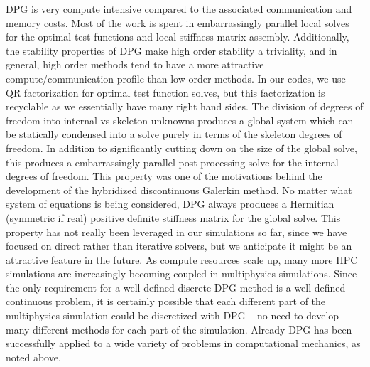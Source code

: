 \documentclass[preprint,12pt]{elsarticle}
\begin{document}
DPG is very compute intensive compared to the associated communication and memory costs.
Most of the work is spent in embarrassingly parallel local solves for the optimal test functions and local stiffness matrix assembly.
Additionally, the stability properties of DPG make high order stability a triviality, and in general, 
high order methods tend to have a more attractive compute/communication profile than low order methods.
In our codes, we use QR factorization for optimal test function solves, but this factorization is recyclable as we essentially have many right hand sides.
The division of degrees of freedom into internal vs skeleton unknowns produces a global system which can be statically condensed into 
a solve purely in terms of the skeleton degrees of freedom.
In addition to significantly cutting down on the size of the global solve, 
this produces a embarrassingly parallel post-processing solve for the internal degrees of freedom.
This property was one of the motivations behind the development of the hybridized discontinuous Galerkin \cite{HDG} method.
No matter what system of equations is being considered, DPG always produces a Hermitian (symmetric if real) 
positive definite stiffness matrix for the global solve.
This property has not really been leveraged in our simulations so far, since we have focused on direct rather than iterative solvers, but we
anticipate it might be an attractive feature in the future.
As compute resources scale up, many more HPC simulations are increasingly becoming coupled in multiphysics simulations.
Since the only requirement for a well-defined discrete DPG method is a well-defined continuous problem, it is certainly possible that each different part of the multiphysics simulation could be discretized with DPG -- no need to develop many different methods for each part of the simulation.
Already DPG has been successfully applied to a wide variety of problems in computational mechanics, as noted above.
\end{document}

